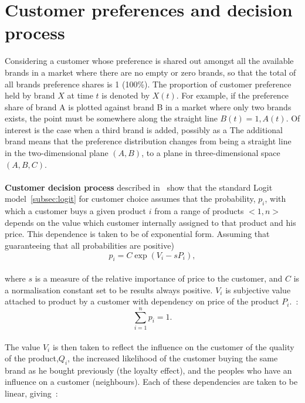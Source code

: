 \section{Customer preferences and decision process} \label{sec:customer_preferences}
Considering a customer whose preference is shared out amongst all the available brands in a market where there are no empty or zero brands,
so that the total of all brands preference shares is 1 (100\%).
The proportion of customer preference held by brand $X$ at time $t$ is denoted by $X(t)$.
For example, if the preference share of brand A is plotted against brand B in a market where only two brands exists,
the point must be somewhere along the straight line $B(t) = 1, A(t)$.
Of interest is the case when a third brand is added, possibly as a
The additional brand means that the preference distribution changes from being a straight line in the two-dimensional plane $(A, B)$,
to a plane in three-dimensional space $(A, B, C)$.\\
\\
\textbf{Customer decision process} \label{sec:cus_decision} described in~\cite{patel} show that the standard Logit model~\ref{subsec:logit} for customer choice assumes that
the probability, $p_i$, with which a customer buys a given product $i$ from a range of products $<1, n>$ depends on
the value which customer internally assigned to that product and his price.
This dependence is taken to be of exponential form.
Assuming that guaranteeing that all probabilities are positive)
\\
\begin{equation} \label{eq:7}
p_i = C\exp(V_i - sP_i),
\end{equation}
\\
where $s$ is a measure of the relative importance of price to the customer, and $C$ is a normalisation constant set to be results always positive. $V_i$ is subjective value
attached to product by a customer with dependency on price of the product $P_i$.~\cite{patel}:
\\
\begin{equation} \label{eq:8}
\sum_{i=1}^n p_i = 1.
\end{equation}
\\
The value $V_i$ is then taken to reflect the influence on the customer of the quality of the product,$Q_i$,
the increased likelihood of the customer buying the same brand as he bought previously (the loyalty effect),
and the peoples who have an influence on a customer (neighbours).
Each of these dependencies are taken to be linear, giving~\cite{patel}:
